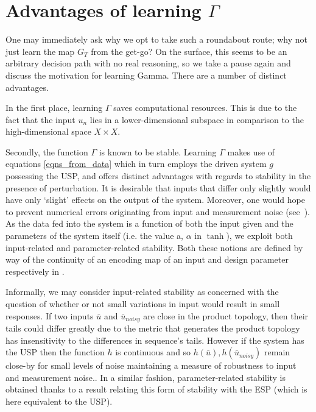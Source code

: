 \documentclass[a4paper,12pt,twoside]{report}
\begin{document}
\section{Advantages of learning $\Gamma$} \label{subs_LearnGamma}

One may immediately ask why we opt to take such a roundabout route; why not just learn the map $G_T$ from the get-go? On the surface, this seems to be an arbitrary decision path with no real reasoning, so we take a pause again and discuss the motivation for learning Gamma.
There are a number of distinct advantages. 

In the first place, learning $\Gamma$ saves computational resources. This is due to the fact that the input $u_n$ lies in a lower-dimensional subspace in comparison to the high-dimensional space $X\times{X}$. 


Secondly, the function $\Gamma$ is known to be stable. Learning $\Gamma$ makes use of equations \ref{eqns_from_data} which in turn employs the driven system $g$ possessing the USP, and offers distinct advantages with regards to stability in the presence of perturbation. It is desirable that inputs that differ only slightly would have only ‘slight’ effects on the output of the system. Moreover, one would hope to prevent numerical errors originating from input and measurement noise (see~\cite[Th. 5]{manjunath2021universal}). 
As the data fed into the system is a function of both the input given and the parameters of the system itself (i.e. the value a, $\alpha$ in $\tanh$), we exploit both input-related and parameter-related stability. Both these notions are defined by way of the continuity of an encoding map of an input and design parameter respectively in \cite{manjunath2020stability}.

Informally, we may consider input-related stability as concerned with the question of whether or not small variations in input would result in small responses.   
If two inputs $\bar{u}$ and $\bar{u}_{noisy}$ are close in the product topology, then their tails could differ greatly due to the metric that generates the product topology has insensitivity to the differences in sequence's tails.
 However if the system has the USP then the function $h$ is continuous and so $h(\bar{u}), h(\bar{u}_{noisy})$ remain close-by for small levels of noise maintaining a measure of robustness to input and measurement noise.\cite{manjunath2021universal}.
In a similar fashion, parameter-related stability is obtained thanks to a result \cite[Lemma 3.2]{manjunath2020stability} relating this form of stability with the ESP (which is here equivalent to the USP).
\end{document}
